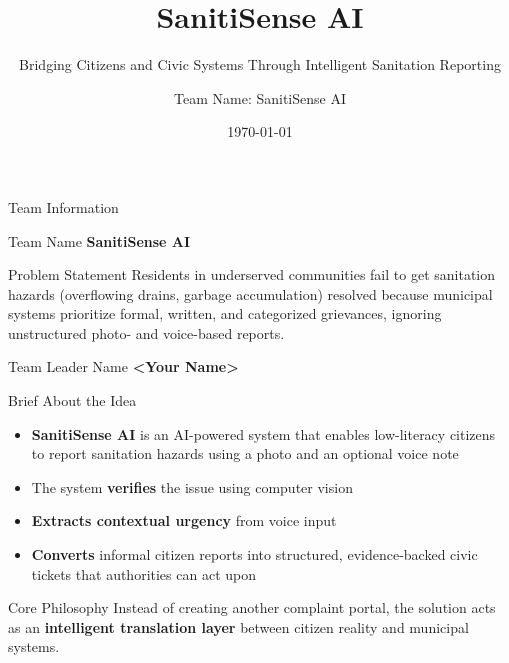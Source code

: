 \documentclass[aspectratio=169]{beamer}
\title{SanitiSense AI}
\subtitle{Bridging Citizens and Civic Systems Through Intelligent Sanitation Reporting}
\author{Team Name: SanitiSense AI}
\date{\today}
\begin{document}
\begin{frame}
\titlepage
\end{frame}

\begin{frame}{Team Information}

\begin{block}{Team Name}
\Large{\textbf{SanitiSense AI}}
\end{block}

\vspace{0.5cm}

\begin{block}{Problem Statement}
Residents in underserved communities fail to get sanitation hazards (overflowing drains, garbage accumulation) resolved because municipal systems prioritize formal, written, and categorized grievances, ignoring unstructured photo- and voice-based reports.
\end{block}

\vspace{0.5cm}

\begin{block}{Team Leader Name}
\textbf{<Your Name>}
\end{block}

\end{frame}

\begin{frame}{Brief About the Idea}

\begin{itemize}
    \item \textbf{SanitiSense AI} is an AI-powered system that enables low-literacy citizens to report sanitation hazards using a photo and an optional voice note
    \vspace{0.3cm}
    \item The system \textbf{verifies} the issue using computer vision
    \vspace{0.3cm}
    \item \textbf{Extracts contextual urgency} from voice input
    \vspace{0.3cm}
    \item \textbf{Converts} informal citizen reports into structured, evidence-backed civic tickets that authorities can act upon
\end{itemize}

\vspace{0.5cm}

\begin{alertblock}{Core Philosophy}
Instead of creating another complaint portal, the solution acts as an \textbf{intelligent translation layer} between citizen reality and municipal systems.
\end{alertblock}

\end{frame}
\end{document}
